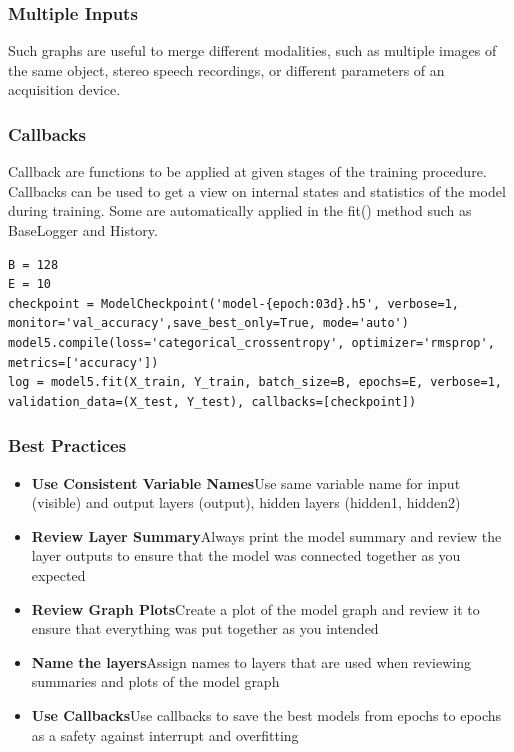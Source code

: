 \documentclass[11pt]{article}
\begin{document}
\subsubsection{Multiple Inputs}
Such graphs are useful to merge different modalities, such as multiple images of the same object, stereo speech recordings, or different parameters of an acquisition device.

\subsubsection{Callbacks}
Callback are functions to be applied at given stages of the training procedure. Callbacks can be used to get a view on internal states and statistics of the model during training.  Some are automatically applied in the fit() method such as BaseLogger and History.
\begin{verbatim}
B = 128
E = 10
checkpoint = ModelCheckpoint('model-{epoch:03d}.h5', verbose=1, monitor='val_accuracy',save_best_only=True, mode='auto')
model5.compile(loss='categorical_crossentropy', optimizer='rmsprop', metrics=['accuracy'])
log = model5.fit(X_train, Y_train, batch_size=B, epochs=E, verbose=1, validation_data=(X_test, Y_test), callbacks=[checkpoint])
\end{verbatim}

\subsubsection{Best Practices}
\begin{itemize}
	\item \textbf{Use Consistent Variable Names}\quad Use same variable name for input (visible) and output layers (output), hidden layers (hidden1, hidden2)
	\item \textbf{Review Layer Summary}\quad Always print the model summary and review the layer outputs to ensure that the model was connected together as you expected
	\item \textbf{Review Graph Plots}\quad Create a plot of the model graph and review it to ensure that everything was put together as you intended
	\item \textbf{Name the layers}\quad Assign names to layers that are used when reviewing summaries and plots of the model graph
	\item \textbf{Use Callbacks}\quad Use callbacks to save the best models from epochs to epochs as a safety against interrupt and overfitting
\end{itemize}
\end{document}
